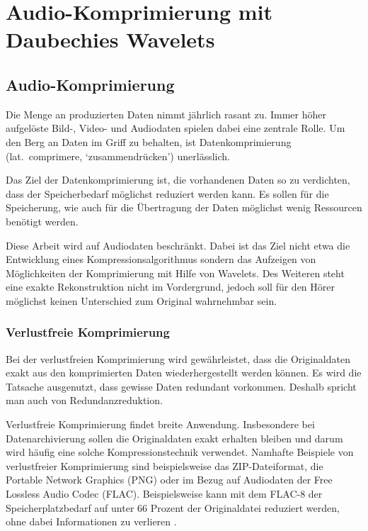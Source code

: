 %
%
%
\chapter{Audio-Komprimierung mit Daubechies Wavelets\label{chapter:compress}}
\begin{refsection}

\section{Audio-Komprimierung}
Die Menge an produzierten Daten nimmt jährlich rasant zu.
Immer höher aufgelöste Bild-, Video- und Audiodaten spielen dabei eine zentrale Rolle.
Um den Berg an Daten im Griff zu behalten, ist Datenkomprimierung (lat.~comprimere, `zusammendrücken') unerlässlich. 

Das Ziel der Datenkomprimierung ist, die vorhandenen Daten so zu verdichten, dass der Speicherbedarf möglichst reduziert werden kann.
Es sollen für die Speicherung, wie auch für die Übertragung der Daten möglichst wenig Ressourcen benötigt werden.

Diese Arbeit wird auf Audiodaten beschränkt.
Dabei ist das Ziel nicht etwa die Entwicklung eines Kompressionsalgorithmus sondern das Aufzeigen von Möglichkeiten der Komprimierung mit Hilfe von Wavelets.
Des Weiteren steht eine exakte Rekonstruktion nicht im Vordergrund, jedoch soll für den Hörer möglichst keinen Unterschied zum Original wahrnehmbar sein.

\subsection{Verlustfreie Komprimierung}
Bei der verlustfreien Komprimierung wird gewährleistet, dass die Originaldaten exakt aus den komprimierten Daten wiederhergestellt werden können.
Es wird die Tatsache ausgenutzt, dass gewisse Daten redundant vorkommen. 
Deshalb spricht man auch von Redundanzreduktion.

Verlustfreie Komprimierung findet breite Anwendung.
Insbesondere bei Datenarchivierung sollen die Originaldaten exakt erhalten bleiben und darum wird häufig eine solche Kompressionstechnik verwendet.
Namhafte Beispiele von verlustfreier Komprimierung sind beispielsweise das ZIP-Dateiformat, die Portable Network Graphics (PNG) oder im Bezug auf Audiodaten der Free Lossless Audio Codec (FLAC).
Beispielsweise kann mit dem FLAC-8 der Speicherplatzbedarf auf unter 66 Prozent der Originaldatei reduziert werden, ohne dabei Informationen zu verlieren \cite{wikipedia:flac}.


\end{refsection}
